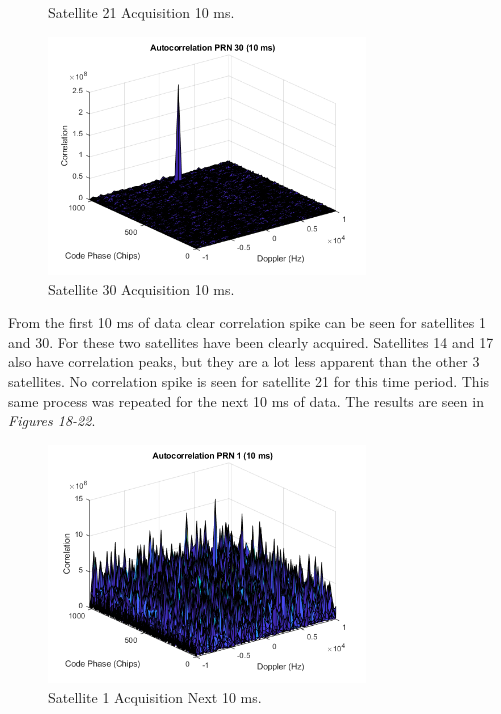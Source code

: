 \documentclass[11pt]{article}
\begin{document}
\begin{enumerate}[label=\textbf{\arabic*.}]
\begin{figure}[H]
        \caption{Satellite 21 Acquisition 10 ms.}
    \end{figure}
    \begin{figure}[H]
        \centering
        \includegraphics[width=0.75\textwidth]{Lab_4_PRN30_10ms.png}
        \caption{Satellite 30 Acquisition 10 ms.}
    \end{figure}
From the first 10 ms of data clear correlation spike can be seen for satellites 1 and 30. For these two satellites have been clearly acquired. Satellites 14 and 17 also have correlation peaks, but they are a lot less apparent than the other 3 satellites. No correlation spike is seen for satellite 21 for this time period. This same process was repeated for the next 10 ms of data. The results are seen in \emph{Figures 18-22}.
    \begin{figure}[H]
        \centering
        \includegraphics[width=0.75\textwidth]{Lab_4_PRN1_10ms.png}
        \caption{Satellite 1 Acquisition Next 10 ms.}
    \end{figure}
    \begin{figure}[H]
        \centering

\end{figure}
\end{enumerate}
\end{document}
